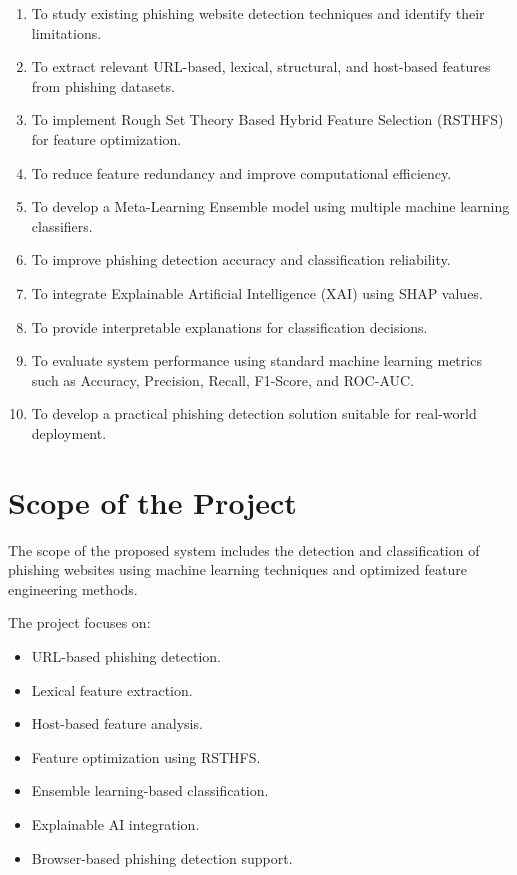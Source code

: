 \documentclass[12pt]{report}
\begin{document}
\begin{enumerate}
    \item To study existing phishing website detection techniques and identify their limitations.
    
    \item To extract relevant URL-based, lexical, structural, and host-based features from phishing datasets.
    
    \item To implement Rough Set Theory Based Hybrid Feature Selection (RSTHFS) for feature optimization.
    
    \item To reduce feature redundancy and improve computational efficiency.
    
    \item To develop a Meta-Learning Ensemble model using multiple machine learning classifiers.
    
    \item To improve phishing detection accuracy and classification reliability.
    
    \item To integrate Explainable Artificial Intelligence (XAI) using SHAP values.
    
    \item To provide interpretable explanations for classification decisions.
    
    \item To evaluate system performance using standard machine learning metrics such as Accuracy, Precision, Recall, F1-Score, and ROC-AUC.
    
    \item To develop a practical phishing detection solution suitable for real-world deployment.
\end{enumerate}

\section{Scope of the Project}

The scope of the proposed system includes the detection and classification of phishing websites using machine learning techniques and optimized feature engineering methods.

The project focuses on:

\begin{itemize}
    \item URL-based phishing detection.
    \item Lexical feature extraction.
    \item Host-based feature analysis.
    \item Feature optimization using RSTHFS.
    \item Ensemble learning-based classification.
    \item Explainable AI integration.
    \item Browser-based phishing detection support.
\end{itemize}
\end{document}
